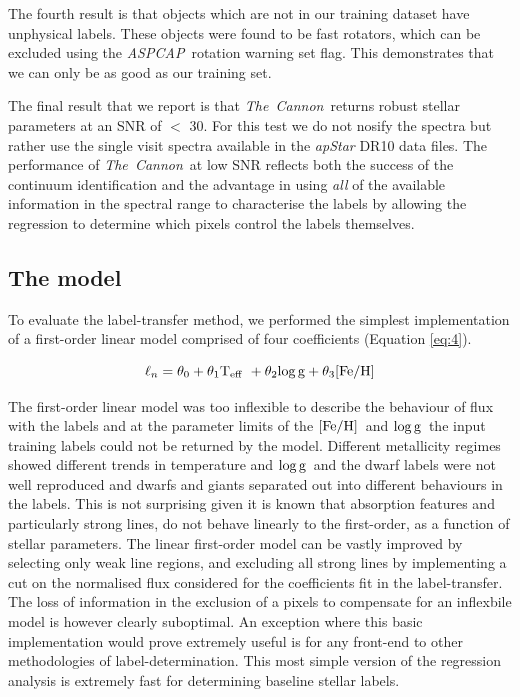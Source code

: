 \documentclass[12pt, preprint]{aastex}
\newcommand{\teff}{\mbox{$\rm T_{eff}$}}
\newcommand{\feh}{\mbox{$\rm [Fe/H]$}}
\newcommand{\logg}{\mbox{$\rm \log g$}}
\newcommand{\tc}{\textsl{The~Cannon}}
\newcommand{\aspcap}{\textsl{ASPCAP}}
\begin{document}
The fourth result is that objects which are not in our training dataset have unphysical labels. These objects were found to be fast rotators, which can be excluded using the \aspcap\ rotation warning set flag. This demonstrates that we can only be as good as our training set. 

The final result that we report is that \tc\ returns robust stellar parameters at an SNR of $<$ 30. For this test we do not nosify the spectra but rather use the single visit spectra available in the \textit{apStar} DR10 data files. The performance of \tc\ at low SNR reflects both the success of the continuum identification and the advantage in using \textit{all} of the available information in the spectral range to characterise the labels by allowing the regression to determine which pixels control the labels themselves.


\subsection{The model} 

To evaluate the label-transfer method, we performed the simplest implementation of a first-order linear model comprised of four coefficients (Equation \ref{eq:4}). 

\begin{equation}
\ell_n = \theta_0 + \theta_1 \teff\ + \theta_2 \logg + \theta_3 \feh 
 \label{eq:4}
 \end{equation}

The first-order linear model was too inflexible to describe the behaviour of flux with the labels and at the parameter limits of the \feh\ and \logg\ the input training labels could not be returned by the model. Different metallicity regimes showed different trends in temperature and \logg\ and the dwarf labels were not well reproduced and dwarfs and giants separated out into different behaviours in the labels. This is not surprising given it is known that absorption features and particularly strong lines, do not behave linearly to the first-order, as a function of stellar parameters. 
The linear first-order model can be vastly improved by selecting only weak line regions, and excluding all strong lines by implementing a cut on the normalised flux considered for the coefficients fit in the label-transfer. The loss of information in the exclusion of a pixels to compensate for an inflexbile model is however clearly suboptimal. An exception where this basic implementation would prove extremely useful is for any front-end to other methodologies of label-determination. This most simple version of the regression analysis is extremely fast for determining baseline stellar labels. 
\end{document}
